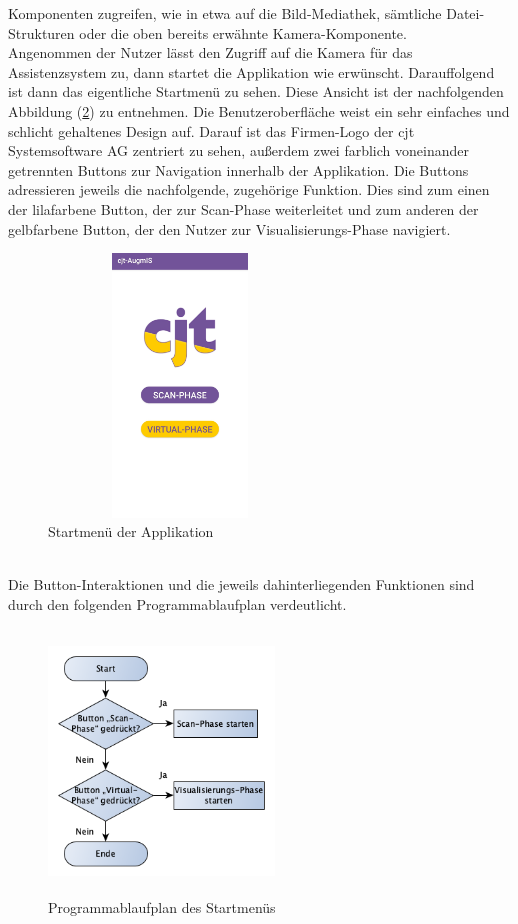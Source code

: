 Komponenten zugreifen, wie in etwa auf die Bild-Mediathek, sämtliche Datei-Strukturen oder die oben bereits erwähnte Kamera-Komponente.
\\ 
\linebreak
Angenommen der Nutzer lässt den Zugriff auf die Kamera für das Assistenzsystem zu, dann startet die Applikation wie erwünscht. Darauffolgend ist dann 
das eigentliche Startmenü zu sehen. Diese Ansicht ist der nachfolgenden Abbildung (\ref{pic:startmenu}) zu entnehmen. Die Benutzeroberfläche weist ein sehr einfaches und 
schlicht gehaltenes Design auf. 
Darauf ist das Firmen-Logo der cjt Systemsoftware AG zentriert zu sehen, außerdem zwei farblich voneinander getrennten Buttons zur Navigation innerhalb der Applikation. 
Die Buttons adressieren jeweils die nachfolgende, zugehörige Funktion. Dies sind zum einen der lilafarbene Button, der zur Scan-Phase weiterleitet und zum anderen der 
gelbfarbene Button, der den Nutzer zur Visualisierungs-Phase navigiert. %
\begin{figure}[hbt!]
    \centering
    \includegraphics[width=7cm,height=7cm,keepaspectratio]{4Umsetzung/Bilder/startmenu.jpg}
    \caption{Startmenü der Applikation}
    \label{pic:startmenu}
\end{figure}
\\
Die Button-Interaktionen und die jeweils dahinterliegenden Funktionen sind durch den folgenden Programmablaufplan verdeutlicht. 
\begin{figure}[hbt!]
    \centering
    \includegraphics[width=6cm,height=7cm,keepaspectratio]{4Umsetzung/Bilder/startPAP.png}
    \caption{Programmablaufplan des Startmenüs}
    \label{pic:startmenu}
\end{figure}
